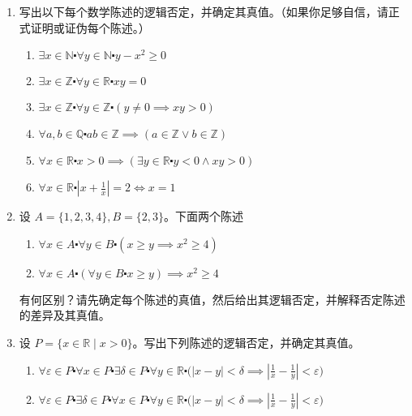 \begin{enumerate}[label=(\arabic*)]
    \item 写出以下每个数学陈述的逻辑否定，并确定其真值。（如果你足够自信，请正式证明或证伪每个陈述。）
    \begin{enumerate}[label=(\alph*)]
        \item $\exists x \in \mathbb{N} \centerdot \forall y \in \mathbb{N} \centerdot y - x^2 \ge 0$
        \item $\exists x \in \mathbb{Z} \centerdot \forall y \in \mathbb{R} \centerdot xy = 0$
        \item $\exists x \in \mathbb{Z} \centerdot \forall y \in \mathbb{Z} \centerdot (y \ne 0 \implies xy > 0)$
        \item $\forall a, b \in \mathbb{Q} \centerdot ab \in \mathbb{Z} \implies (a \in \mathbb{Z} \lor b \in \mathbb{Z})$
        \item $\forall x \in \mathbb{R} \centerdot x > 0 \implies (\exists y \in \mathbb{R} \centerdot y < 0 \land xy > 0)$
        \item $\forall x \in \mathbb{R} \centerdot |x + \frac{1}{x}| = 2 \iff x = 1$
    \end{enumerate}
    \item 设 $A = \{1, 2, 3, 4\}, B = \{2, 3\}$。下面两个陈述
        \begin{enumerate}[label=(\alph*)]
            \item $\forall x \in A \centerdot \forall y \in B \centerdot (x \ge y \implies x^2 \ge 4)$
            \item $\forall x \in A \centerdot (\forall y \in B \centerdot x \ge y) \implies x^2 \ge 4$
        \end{enumerate}
        有何区别？请先确定每个陈述的真值，然后给出其逻辑否定，并解释否定陈述的差异及其真值。
    \item 设 $P = \{x \in \mathbb{R} \mid x > 0\}$。写出下列陈述的逻辑否定，并确定其真值。
        \begin{enumerate}[label=(\alph*)]
            \item $\forall \varepsilon \in P \centerdot \forall x \in P \centerdot \exists \delta \in P \centerdot \forall y \in \mathbb{R} \centerdot \Big(|x-y|<\delta \implies |\frac{1}{x} - \frac{1}{y}| < \varepsilon \Big)$
            \item $\forall \varepsilon \in P \centerdot \exists \delta \in P \centerdot \forall x \in P \centerdot \forall y \in \mathbb{R} \centerdot \Big(|x-y|<\delta \implies |\frac{1}{x} - \frac{1}{y}| < \varepsilon \Big)$

\end{enumerate}
\end{enumerate}
